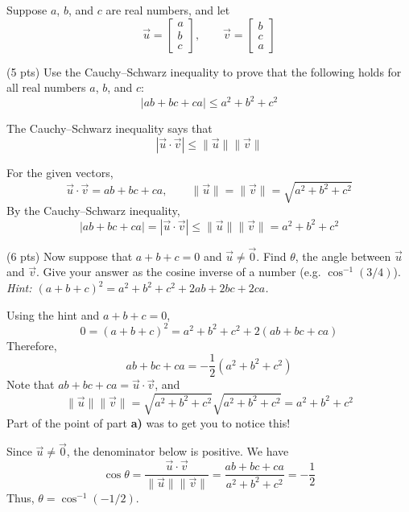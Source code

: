 \documentclass[11pt,twoside]{article}
\begin{document}
\begin{prob}[(11 pts)]
Suppose $a$, $b$, and $c$ are real numbers, and let
\[
\vec u=\begin{bmatrix}a\\b\\c\end{bmatrix},\qquad
\vec v=\begin{bmatrix}b\\c\\a\end{bmatrix}
\]
\begin{subprob}(5 pts) Use the Cauchy--Schwarz inequality to prove that the following holds for all real numbers $a$, $b$, and $c$:
\[
|ab+bc+ca|\leq a^2+b^2+c^2
\]


\begin{solution}
The Cauchy--Schwarz inequality says that
\[
|\vec u\cdot\vec v|\leq\lVert\vec u\rVert\lVert\vec v\rVert
\]

For the given vectors,
\[
\vec u\cdot\vec v=ab+bc+ca,\qquad
\lVert\vec u\rVert=\lVert\vec v\rVert=\sqrt{a^2+b^2+c^2}
\]
By the Cauchy--Schwarz inequality,
\[
|ab+bc+ca|=|\vec u\cdot\vec v|
\leq\lVert\vec u\rVert\lVert\vec v\rVert
=\boxed{a^2+b^2+c^2}
\]
\end{solution}
\end{subprob}

\begin{subprob}(6 pts) Now suppose that $a+b+c=0$ and $\vec u\neq\vec0$. Find $\theta$, the angle between $\vec u$ and $\vec v$. Give your answer as the cosine inverse of a number (e.g. $\cos^{-1}(3/4)$). \textit{Hint: $(a+b+c)^2=a^2+b^2+c^2+2ab+2bc+2ca$.}
\par\medskip


\begin{solution}
Using the hint and $a+b+c=0$,
\[
0=(a+b+c)^2=a^2+b^2+c^2+2(ab+bc+ca)
\]
Therefore,
\[
ab+bc+ca=-\frac12(a^2+b^2+c^2)
\]
Note that $ab+bc+ca=\vec u\cdot\vec v$, and
\[
\lVert\vec u\rVert\lVert\vec v\rVert
=\sqrt{a^2+b^2+c^2}\sqrt{a^2+b^2+c^2}
=a^2+b^2+c^2
\]
Part of the point of part \textbf{a)} was to get you to notice this!

Since $\vec u\neq\vec0$, the denominator below is positive. We have
\[
\cos\theta=\frac{\vec u\cdot\vec v}{\lVert\vec u\rVert\lVert\vec v\rVert}
=\frac{ab+bc+ca}{a^2+b^2+c^2}=-\frac12
\]
Thus, $\boxed{\theta=\cos^{-1}(-1/2)}$.
\end{solution}
\end{subprob}
\end{prob}\clearpage
\end{document}
